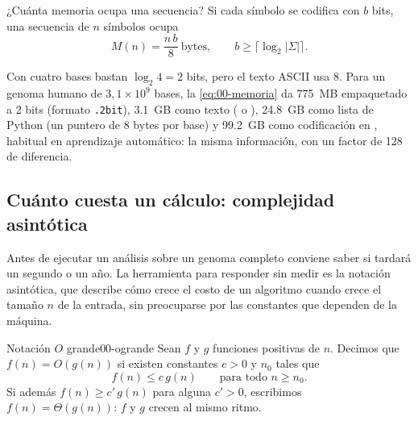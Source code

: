 \begin{simbolos}
\end{simbolos}

¿Cuánta memoria ocupa una secuencia? Si cada símbolo se codifica con $b$ bits, una secuencia de $n$ símbolos ocupa
\begin{equation}\label{eq:00-memoria}
M(n) = \frac{n\,b}{8}\ \text{bytes}, \qquad b \ge \lceil \log_2 |\Sigma| \rceil .
\end{equation}

\begin{simbolos}
\end{simbolos}

Con cuatro bases bastan $\log_2 4 = 2$ bits, pero el texto ASCII usa 8. Para un genoma humano de $3{,}1\times10^9$ bases, la \cref{eq:00-memoria} da \SI{775}{MB} empaquetado a 2 bits (formato \texttt{.2bit}), \SI{3,1}{GB} como texto ( o ), \SI{24,8}{GB} como lista de Python (un puntero de 8 bytes por base) y \SI{99,2}{GB} como codificación  en , habitual en aprendizaje automático: la misma información, con un factor de 128 de diferencia.

\subsection{Cuánto cuesta un cálculo: complejidad asintótica}

Antes de ejecutar un análisis sobre un genoma completo conviene saber si tardará un segundo o un año. La herramienta para responder sin medir es la notación asintótica, que describe cómo crece el costo de un algoritmo cuando crece el tamaño $n$ de la entrada, sin preocuparse por las constantes que dependen de la máquina.

\begin{definicion}{Notación $O$ grande}{00-ogrande}
Sean $f$ y $g$ funciones positivas de $n$. Decimos que $f(n)=O(g(n))$ si existen constantes $c>0$ y $n_0$ tales que
\begin{equation}\label{eq:00-ogrande}
f(n) \le c\,g(n) \qquad \text{para todo } n\ge n_0 .
\end{equation}
Si además $f(n)\ge c'\,g(n)$ para alguna $c'>0$, escribimos $f(n)=\Theta(g(n))$: $f$ y $g$ crecen al mismo ritmo.
\end{definicion}

